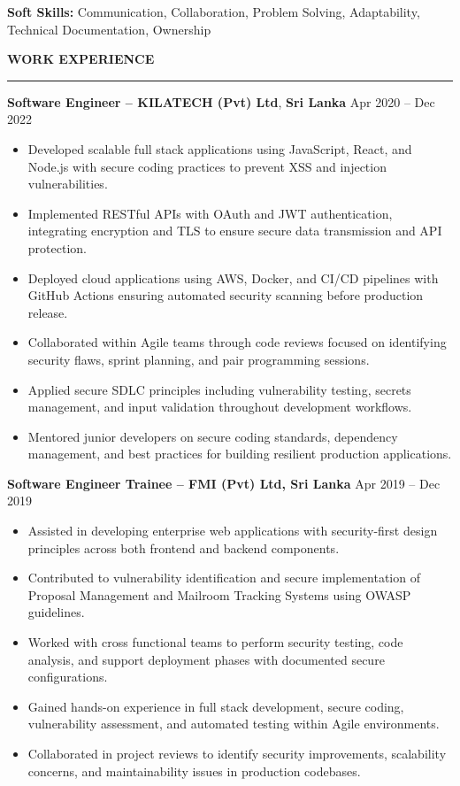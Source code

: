 \documentclass[10pt,letterpaper]{article}
\begin{document}
\textbf{Soft Skills:} Communication, Collaboration, Problem Solving, Adaptability, Technical Documentation, Ownership

\vspace{8pt}

\textbf{WORK EXPERIENCE}\\[-8pt]
\noindent\rule{\textwidth}{1pt}

\vspace{-2pt}

\textbf{Software Engineer -- KILATECH (Pvt) Ltd}, \textbf{Sri Lanka} \hfill Apr 2020 -- Dec 2022

\vspace{-1pt}

\begin{itemize}
\item Developed scalable full stack applications using JavaScript, React, and Node.js with secure coding practices to prevent XSS and injection vulnerabilities.
\item Implemented RESTful APIs with OAuth and JWT authentication, integrating encryption and TLS to ensure secure data transmission and API protection.
\item Deployed cloud applications using AWS, Docker, and CI/CD pipelines with GitHub Actions ensuring automated security scanning before production release.
\item Collaborated within Agile teams through code reviews focused on identifying security flaws, sprint planning, and pair programming sessions.
\item Applied secure SDLC principles including vulnerability testing, secrets management, and input validation throughout development workflows.
\item Mentored junior developers on secure coding standards, dependency management, and best practices for building resilient production applications.
\end{itemize}

\textbf{Software Engineer Trainee -- FMI (Pvt) Ltd, Sri Lanka} \hfill Apr 2019 -- Dec 2019

\vspace{-1pt}

\begin{itemize}
\item Assisted in developing enterprise web applications with security-first design principles across both frontend and backend components.
\item Contributed to vulnerability identification and secure implementation of Proposal Management and Mailroom Tracking Systems using OWASP guidelines.
\item Worked with cross functional teams to perform security testing, code analysis, and support deployment phases with documented secure configurations.
\item Gained hands-on experience in full stack development, secure coding, vulnerability assessment, and automated testing within Agile environments.
\item Collaborated in project reviews to identify security improvements, scalability concerns, and maintainability issues in production codebases.
\end{itemize}
\end{document}
